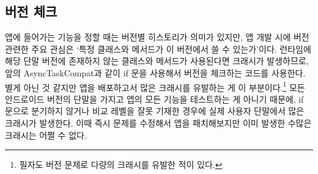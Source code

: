 \subsection{버전 체크}
앱에 들어가는 기능을 정할 때는 버전별 히스토리가 의미가 있지만, 앱 개발 시에 버전 관련한 주요 관심은 `특정 클래스와 메서드가 이 버전에서 쓸 수 있는가'이다.
런타임에 해당 단말 버전에 존재하지 않는 클래스와 메서드가 사용된다면 크래시가 발생하므로, 앞의 AsyncTaskCompat과 같이 if 문을 사용해서 버전을 체크하는 코드를 사용한다.\\

별게 아닌 것 같지만 앱을 배포하고서 많은 크래시를 유발하는 게 이 부분이다.\footnote{필자도 버전 문제로 다량의 크래시를 유발한 적이 있다.}
모든 안드로이드 버전의 단말을 가지고 앱의 모든 기능을 테스트하는 게 아니기 때문에, if 문으로 분기하지 않거나 비교 레벨을 잘못 기재한 경우에 실제 사용자 단말에서 많은 크래시가 발생한다. 
이때 즉시 문제를 수정해서 앱을 패치해보지만 이미 발생한 수많은 크래시는 어쩔 수 없다.\\

